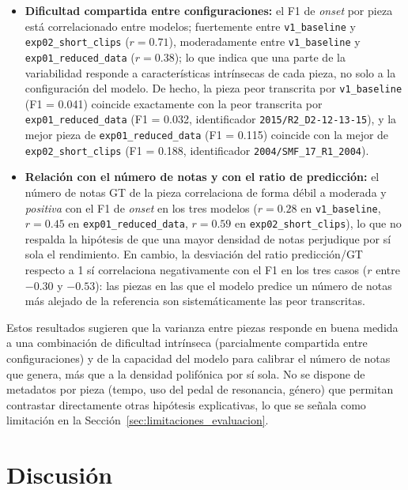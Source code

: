 \begin{itemize}
    \item \textbf{Dificultad compartida entre configuraciones:} el F1
    de \textit{onset} por pieza está correlacionado entre modelos;
    fuertemente entre \texttt{v1\_baseline} y
    \texttt{exp02\_short\_clips} ($r = 0.71$), moderadamente entre
    \texttt{v1\_baseline} y \texttt{exp01\_reduced\_data}
    ($r = 0.38$); lo que indica que una parte de la variabilidad
    responde a características intrínsecas de cada pieza, no solo a
    la configuración del modelo. De hecho, la pieza peor transcrita
    por \texttt{v1\_baseline} (F1 = 0.041) coincide exactamente con la
    peor transcrita por \texttt{exp01\_reduced\_data} (F1 = 0.032,
    identificador \texttt{2015/R2\_D2-12-13-15}), y la mejor pieza de \newline\texttt{exp01\_reduced\_data} (F1 = 0.115) coincide con la mejor
    de \texttt{exp02\_short\_clips} (F1 = 0.188, identificador
    \texttt{2004/SMF\_17\_R1\_2004}).
    \item \textbf{Relación con el número de notas y con el ratio de
    predicción:} el número de notas GT de la pieza correlaciona de
    forma débil a moderada y \emph{positiva} con el F1 de
    \textit{onset} en los tres modelos ($r = 0.28$ en
    \texttt{v1\_baseline}, $r = 0.45$ en
    \texttt{exp01\_reduced\_data}, $r = 0.59$ en
    \texttt{exp02\_short\_clips}), lo que no respalda la hipótesis de
    que una mayor densidad de notas perjudique por sí sola el
    rendimiento. En cambio, la desviación del ratio predicción/GT
    respecto a 1 sí correlaciona negativamente con el F1 en los tres
    casos ($r$ entre $-0.30$ y $-0.53$): las piezas en las que el
    modelo predice un número de notas más alejado de la referencia
    son sistemáticamente las peor transcritas.
\end{itemize}

Estos resultados sugieren que la varianza entre piezas responde en
buena medida a una combinación de dificultad intrínseca (parcialmente
compartida entre configuraciones) y de la capacidad del modelo para
calibrar el número de notas que genera, más que a la densidad
polifónica por sí sola. No se dispone de metadatos por pieza (tempo,
uso del pedal de resonancia, género) que permitan contrastar
directamente otras hipótesis explicativas, lo que se señala como
limitación en la Sección~\ref{sec:limitaciones_evaluacion}.
\clearpage
\section{Discusión}
\label{sec:discusion}

